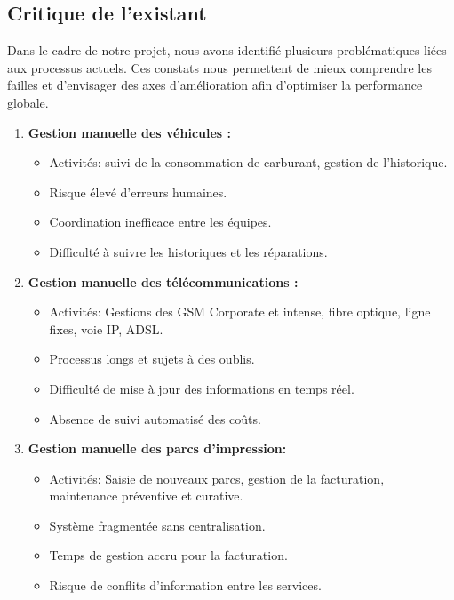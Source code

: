 \documentclass[a4paper,11pt]{report}
\begin{document}
\subsection{Critique de l'existant}

Dans le cadre de notre projet, nous avons identifié plusieurs problématiques liées aux processus actuels. Ces constats nous permettent de mieux comprendre les failles et d'envisager des axes d'amélioration afin d'optimiser la performance globale.


\begin{enumerate}

\item \textbf{Gestion manuelle des véhicules : } 
\begin{itemize}
	\item Activités: suivi de la consommation de carburant, gestion de l'historique.
	\item Risque élevé d'erreurs humaines.
	\item Coordination inefficace entre les équipes.
	\item Difficulté à suivre les historiques et les réparations. \\
	 \newline

\end{itemize}

\item \textbf{Gestion manuelle des télécommunications :} 
\begin{itemize}
	\item Activités: Gestions des GSM Corporate et intense, fibre optique, ligne fixes, voie IP, ADSL.
	\item Processus longs et sujets à des oublis.
	\item Difficulté de mise à jour des informations en temps réel.
	\item Absence de suivi automatisé des coûts.	 
\end{itemize}

\item \textbf{Gestion manuelle des parcs d'impression:}
\begin{itemize}
	\item Activités: Saisie de nouveaux parcs, gestion de la facturation, maintenance préventive et curative.
	\item Système fragmentée sans centralisation.
	\item Temps de gestion accru pour la facturation.
	\item Risque de conflits d'information entre les services.
\end{itemize}


\end{enumerate}
\end{document}

